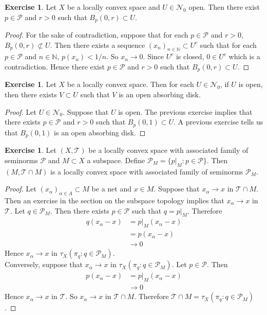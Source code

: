 \documentclass[12pt]{amsart}
\theoremstyle{definition}
\newtheorem{ex}[definition]{Exercise}
\newcommand{\al}{\alpha}
\newcommand{\N}{\mathbb{N}}
\newcommand{\MN}{\mathcal{N}}
\newcommand{\MP}{\mathcal{P}}
\newcommand{\MT}{\mathcal{T}}
\begin{document}
	
	\begin{ex}
		Let $X$ be a locally convex space and $U \in \MN_0$ open. Then there exist $p \in \MP$ and $r >0$ such that $B_p(0,r) \subset U$.
	\end{ex}

	\begin{proof}
		For the sake of contradiction, suppose that for each $p \in \MP$ and $r >0$, $B_p(0,r) \not \subset U$. Then there exists a sequence $(x_n)_{n \in \N} \subset U^c$ such that for each $p \in \MP$ and $n \in \N$, $p(x_n) < 1/n$. So $x_n \rightarrow 0$. Since $U^c$ is closed, $0 \in U^c$ which is a contradiction. Hence there exist $p \in \MP$ and $r >0$ such that $B_p(0,r) \subset U$.
	\end{proof}

	\begin{ex}
		Let $X$ be a locally convex space. Then for each $U \in \MN_0$, if $U$ is open, then there exists $V \subset U$ such that $V$ is an open absorbing disk.
	\end{ex}

	\begin{proof}
		Let $U \in \MN_0$. Suppose that $U$ is open. The previous exercise implies that there exists $p \in \MP$ and $r > 0$ such that $B_p(0,1) \subset U$. A previous exercise tells us that $B_p(0,1)$ is an open absorbing disk.
	\end{proof}

	\begin{ex}
		Let $(X, \MT)$ be a locally convex space with associated  family of seminorms $\MP$ and $M \subset X$ a subspace. Define $\MP_M = \{p|_M: p \in \MP\}$. Then $(M, \MT \cap M)$ is a locally convex space with associated family of seminorms $\MP_M$. 
	\end{ex}

	\begin{proof}
		Let $(x_{\al})_{\al \in A} \subset M$ be a net and $x \in M$. Suppose that $x_{\al} \rightarrow x$ in $\MT \cap M$. Then an exercise in the section on the subspace topology implies that $x_{\al} \rightarrow x$ in $\MT$. Let $q \in \MP_M$. Then there exists $p \in \MP$ such that $q = p|_M$. Therefore
		\begin{align*}
			q(x_{\al} - x) 
			&= p|_M(x_{\al} - x) \\ 
			&= p(x_{\al} - x) \\
			& \rightarrow 0
		\end{align*}  
		Hence $x_{\al} \rightarrow x$ in $\tau_X(\pi_q:q \in \MP_M)$. \\
		Conversely, suppose that $x_{\al} \rightarrow x$ in $\tau_X(\pi_q:q \in \MP_M)$. Let $p \in \MP$. Then 
		\begin{align*}
			p(x_{\al} - x) 
			&= p|_M(x_{\al} - x) \\
			& \rightarrow 0
		\end{align*}
		Hence $x_{\al} \rightarrow x$ in $\MT$. So $x_{\al} \rightarrow x$ in $\MT \cap M$. Therefore $\MT \cap M = \tau_X(\pi_q: q \in \MP_M)$. 
	\end{proof}
	
\end{document}
